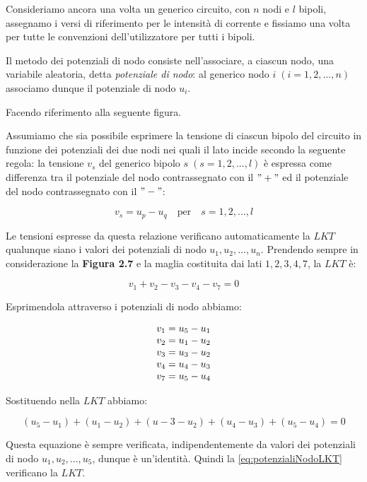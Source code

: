 \documentclass[a4paper]{report}
\begin{document}
Consideriamo ancora una volta un generico circuito, con $n$ nodi e $l$
bipoli, assegnamo i versi di riferimento per le intensit\`a di
corrente e fissiamo una volta per tutte le convenzioni
dell'utilizzatore per tutti i bipoli.

Il metodo dei potenziali di nodo consiste nell'associare, a ciascun
nodo, una variabile aleatoria, detta \emph{potenziale di nodo}: al
generico nodo $i\;(i=1, 2,...,n)$ associamo dunque il potenziale di nodo
$u_i$.

Facendo riferimento alla seguente figura.


Assumiamo che sia possibile esprimere la tensione di ciascun bipolo
del circuito in funzione dei potenziali dei due nodi nei quali il lato
incide secondo la seguente regola: la tensione $v_s$ del generico
bipolo $s\;(s=1, 2,...,l)$ \`e espressa come differenza tra il
potenziale del nodo contrassegnato con il $"+"$ ed il potenziale del
nodo contrassegnato con il $"-"$:

\begin{equation}\label{eq:potenzialiNodo}
v_s=u_p-u_q \quad \text{per} \quad s=1, 2,...,l
\end{equation}

Le tensioni espresse da questa relazione verificano automaticamente la
$LKT$ qualunque siano i valori dei potenziali di nodo $u_1, u_2,...,
u_n$.
Prendendo sempre in considerazione la {\bf Figura 2.7} e la maglia
costituita dai lati $1, 2, 3, 4, 7$, la $LKT$ \`e:

\[
v_1+v_2-v_3-v_4-v_7=0
\]

Esprimendola attraverso i potenziali di nodo abbiamo:

\begin{equation}\label{eq:potenzialiNodoLKT}
  \begin{array}{l l l l l}
    v_1=u_5-u_1\\
    v_2=u_1-u_2\\
    v_3=u_3-u_2\\
    v_4=u_4-u_3\\
    v_7=u_5-u_4
  \end{array}
\end{equation}

Sostituendo nella $LKT$ abbiamo:

\[
(u_5-u_1)+(u_1-u_2)+(u-3-u_2)+(u_4-u_3)+(u_5-u_4)=0
\]

Questa equazione \`e sempre verificata, indipendentemente da valori
dei potenziali di nodo $u_1, u_2,..., u_5$, dunque \`e
un'identit\`a. Quindi la \ref{eq:potenzialiNodoLKT} verificano la $LKT$.
\end{document}
